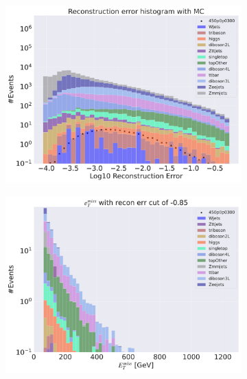 \begin{figure}[H]
    \centering
    \begin{subfigure}{.49\textwidth}
        \includegraphics[width=\textwidth]{Figures/AE_testing/small/3lep/b_data_recon_big_rm3_feats_sig_450p0p0300.pdf}
        \caption{ }
        \label{fig:AE_3lep_small_450_3}
    \end{subfigure}
    \hfill
    \begin{subfigure}{.49\textwidth}
        \includegraphics[width=\textwidth]{Figures/AE_testing/small/3lep/b_data_recon_big_rm3_feats_sig_450p0p0300_etmiss_recon_errcut_-0.85.pdf}
        \caption{}
        \label{fig:AE_3lep_small_etmiss_450_3}
    \end{subfigure}

\end{figure}
